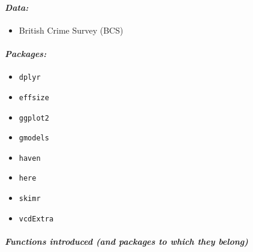 \documentclass[
]{book}
\providecommand{\tightlist}{%
  \setlength{\itemsep}{0pt}\setlength{\parskip}{0pt}}
\begin{document}
\hypertarget{data-6}{%
\paragraph*{\texorpdfstring{\emph{Data:}}{Data:}}\label{data-6}}

\begin{itemize}
\tightlist
\item
  British Crime Survey (BCS)
\end{itemize}

\hypertarget{packages-7}{%
\paragraph*{\texorpdfstring{\emph{Packages:}}{Packages:}}\label{packages-7}}

\begin{itemize}
\tightlist
\item
  \texttt{dplyr}
\item
  \texttt{effsize}
\item
  \texttt{ggplot2}
\item
  \texttt{gmodels}
\item
  \texttt{haven}
\item
  \texttt{here}
\item
  \texttt{skimr}
\item
  \texttt{vcdExtra}
\end{itemize}

\hypertarget{functions-introduced-and-packages-to-which-they-belong-6}{%
\paragraph*{\texorpdfstring{\emph{Functions introduced (and packages to which they belong)}}{Functions introduced (and packages to which they belong)}}\label{functions-introduced-and-packages-to-which-they-belong-6}}
\end{document}
